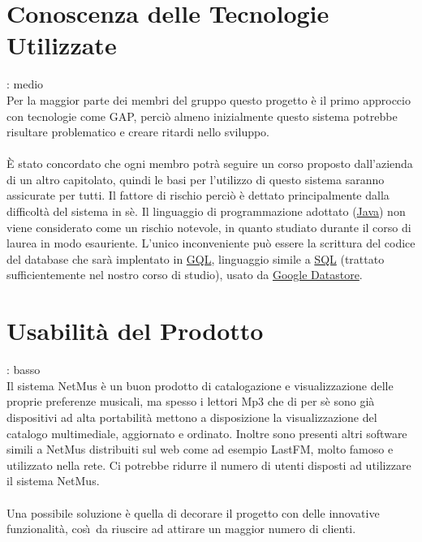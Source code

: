 \section{Conoscenza delle Tecnologie Utilizzate}
: medio\\
Per la maggior parte dei membri del gruppo questo progetto \`e il primo approccio con tecnologie come GAP, 
perci\`o almeno inizialmente questo sistema potrebbe risultare problematico e
creare ritardi nello sviluppo.\\
\\ 
\`E stato concordato che ogni membro potr\`a seguire un corso proposto
  dall'azienda di un altro capitolato, quindi le basi per l'utilizzo di questo
  sistema saranno assicurate per tutti. Il fattore di rischio perci\`o \`e
  dettato principalmente dalla difficolt\`a del sistema in s\`e. Il linguaggio
  di programmazione adottato (\underline{Java}) non viene considerato come un
  rischio notevole, in quanto studiato durante il corso di laurea in modo
  esauriente. L'unico inconveniente pu\`o essere la scrittura del codice del
  database che sar\`a implentato in \underline{GQL}, linguaggio simile a
  \underline{SQL} (trattato sufficientemente nel nostro corso di studio), usato
  da \underline{Google Datastore}.

\section{Usabilit\`a del Prodotto}
: basso\\
Il sistema NetMus \`e un buon prodotto di catalogazione e visualizzazione delle
proprie preferenze musicali, ma spesso i lettori Mp3 che di per s\`e sono gi\`a
dispositivi ad alta portabilit\`a mettono a disposizione la visualizzazione del
catalogo multimediale, aggiornato e ordinato. Inoltre sono presenti altri
software simili a NetMus distribuiti sul web come ad esempio LastFM, molto
famoso e utilizzato nella rete. Ci potrebbe ridurre il numero di utenti disposti
ad utilizzare il sistema NetMus.\\
\\
Una possibile soluzione \`e quella di decorare il progetto con delle
innovative funzionalit\`a, cos\`\i\ da riuscire ad attirare un maggior numero di clienti.

